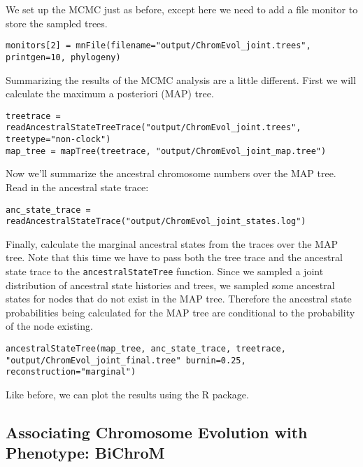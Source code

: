 We set up the MCMC just as before, except here we
need to add a file monitor to store the sampled trees.
{\tt \begin{snugshade*}
\begin{lstlisting}
monitors[2] = mnFile(filename="output/ChromEvol_joint.trees", printgen=10, phylogeny)
\end{lstlisting}
\end{snugshade*}}
Summarizing the results of the MCMC analysis are a little different.
First we will calculate the maximum a posteriori (MAP) tree.
{\tt \begin{snugshade*}
\begin{lstlisting}
treetrace = readAncestralStateTreeTrace("output/ChromEvol_joint.trees", treetype="non-clock")
map_tree = mapTree(treetrace, "output/ChromEvol_joint_map.tree")
\end{lstlisting}
\end{snugshade*}}
Now we'll summarize the ancestral chromosome numbers over the MAP tree.
Read in the ancestral state trace:
{\tt \begin{snugshade*}
\begin{lstlisting}
anc_state_trace = readAncestralStateTrace("output/ChromEvol_joint_states.log")
\end{lstlisting}
\end{snugshade*}}
Finally, calculate the marginal ancestral states from the traces over the MAP tree.
Note that this time we have to pass both the tree trace and the ancestral state
trace to the \texttt{ancestralStateTree} function.
Since we sampled a joint distribution of ancestral state histories and trees,
we sampled some ancestral states for nodes that do not exist in the MAP tree.
Therefore the ancestral state probabilities being calculated for the MAP tree
are conditional to the probability of the node existing.
{\tt \begin{snugshade*}
\begin{lstlisting}
ancestralStateTree(map_tree, anc_state_trace, treetrace, "output/ChromEvol_joint_final.tree" burnin=0.25, reconstruction="marginal")
\end{lstlisting}
\end{snugshade*}}
Like before, we can plot the results using the \RevGadgets R package.

\bigskip

\subsection{Associating Chromosome Evolution with Phenotype: BiChroM}\label{subsect:clado_simple}


